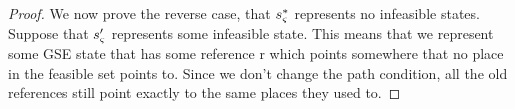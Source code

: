 \begin{proof}

We now prove the reverse case, that $s_{\varsigma}^*$ represents no infeasible states. Suppose that $s_{\varsigma}^\prime$ represents some infeasible state. This means that we represent some GSE state that has some reference r which points somewhere that no place in the feasible set points to. Since we don't change the path condition, all the old references still point exactly to the same places they used to. 


\end{proof}
